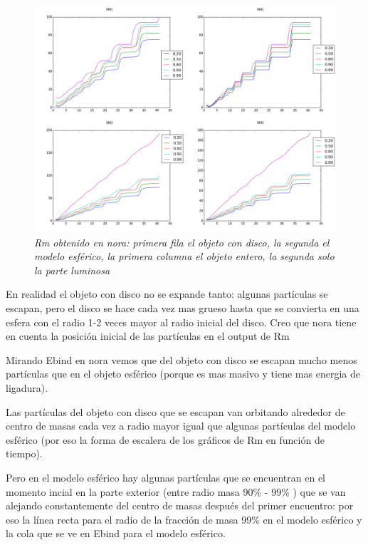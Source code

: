 \documentclass[12pt]{article} %
\renewcommand{\=}[1]{\stackrel{#1}{=}} %
\theoremstyle{definition}
\theoremstyle{remark}
\begin{document}
\begin{figure}[!ht]
 \centering
 \includegraphics[scale=0.2]{rmsep5.png}
 \caption{\emph{Rm obtenido en nora: primera fila el objeto con disco, la segunda el modelo esférico, la primera columna el objeto entero, la segunda solo la parte luminosa }}
\end{figure}

En realidad el objeto con disco no se expande tanto: algunas partículas se escapan, pero el disco se hace cada vez mas grueso hasta que se convierta  en  una esfera con el radio 1-2 veces mayor  al radio inicial del disco. 
Creo que nora tiene en cuenta la posición inicial de las partículas en el output de Rm

Mirando Ebind en nora vemos que del objeto con disco se escapan mucho menos partículas que en el objeto esférico (porque es mas masivo y tiene mas energia  de ligadura). 

Las partículas del objeto con disco que se escapan van orbitando alrededor de centro de masas cada vez a radio mayor igual que algunas partículas del modelo esférico (por eso la forma de escalera de los gráficos de Rm en función de tiempo).
 
Pero en el modelo esférico hay algunas partículas que se encuentran en el momento incial en la parte exterior (entre radio masa 90\% - 99\% ) que se van alejando constantemente del centro de masas después del primer encuentro: por eso la línea recta para el radio de la fracción de masa 99\% en el modelo esférico y la cola  que se ve en Ebind para el modelo esférico.
\end{document}
